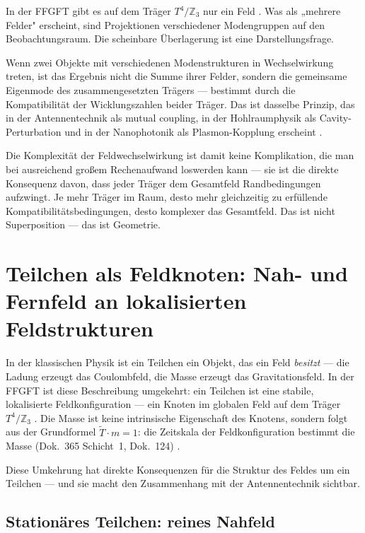 In der FFGFT gibt es auf dem Träger $T^4/\mathbb{Z}_3$ nur ein Feld
\SetzM. Was als „mehrere Felder" erscheint, sind Projektionen
verschiedener Modengruppen auf den Beobachtungsraum. Die scheinbare
Überlagerung ist eine Darstellungsfrage.

Wenn zwei Objekte mit verschiedenen Modenstrukturen in Wechselwirkung
treten, ist das Ergebnis nicht die Summe ihrer Felder, sondern die
gemeinsame Eigenmode des zusammengesetzten Trägers --- bestimmt durch
die Kompatibilität der Wicklungszahlen beider Träger. Das ist dasselbe
Prinzip, das in der Antennentechnik als mutual coupling, in der
Hohlraumphysik als Cavity-Perturbation und in der Nanophotonik als
Plasmon-Kopplung erscheint \SM.

Die Komplexität der Feldwechselwirkung ist damit keine Komplikation,
die man bei ausreichend großem Rechenaufwand loswerden kann --- sie ist
die direkte Konsequenz davon, dass jeder Träger dem Gesamtfeld
Randbedingungen aufzwingt. Je mehr Träger im Raum, desto mehr
gleichzeitig zu erfüllende Kom\-pa\-ti\-bi\-li\-täts\-be\-din\-gun\-gen, desto
komplexer das Gesamtfeld. Das ist nicht Superposition --- das ist
Geometrie.

\section{Teilchen als Feldknoten: Nah- und Fernfeld an lokalisierten Feldstrukturen}

In der klassischen Physik ist ein Teilchen ein Objekt, das ein Feld
\emph{besitzt} --- die Ladung erzeugt das Coulombfeld, die Masse erzeugt
das Gravitationsfeld. In der FFGFT ist diese Beschreibung umgekehrt: ein
Teilchen ist eine stabile, lokalisierte Feldkonfiguration --- ein Knoten
im globalen Feld auf dem Träger $T^4/\mathbb{Z}_3$ \SetzM. Die Masse ist
keine intrinsische Eigenschaft des Knotens, sondern folgt aus der
Grundformel $\tilde{T}\cdot m=1$: die Zeitskala der Feldkonfiguration
bestimmt die Masse (Dok.~365 Schicht~1, Dok.~124) \KM.

Diese Umkehrung hat direkte Konsequenzen für die Struktur des Feldes
um ein Teilchen --- und sie macht den Zusammenhang mit der Antennentechnik
sichtbar.

\subsection*{Stationäres Teilchen: reines Nahfeld}

